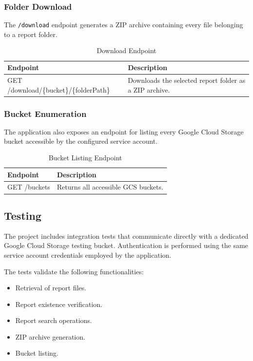 \subsubsection{Folder Download}

The \texttt{/download} endpoint generates a ZIP archive containing every file belonging to a report folder.

\begin{table}[H]
\centering
\caption{Download Endpoint}
\begin{tabular}{|p{6cm}|p{7cm}|}
\hline
\textbf{Endpoint} & \textbf{Description} \\
\hline
GET /download/\{bucket\}/\{folderPath\} & Downloads the selected report folder as a ZIP archive. \\
\hline
\end{tabular}
\end{table}

\subsubsection{Bucket Enumeration}

The application also exposes an endpoint for listing every Google Cloud Storage bucket accessible by the configured service account.

\begin{table}[H]
\centering
\caption{Bucket Listing Endpoint}
\begin{tabular}{|p{6cm}|p{7cm}|}
\hline
\textbf{Endpoint} & \textbf{Description} \\
\hline
GET /buckets & Returns all accessible GCS buckets. \\
\hline
\end{tabular}
\end{table}

\subsection{Testing}

The project includes integration tests that communicate directly with a dedicated Google Cloud Storage testing bucket. Authentication is performed using the same service account credentials employed by the application.

The tests validate the following functionalities:

\begin{itemize}
    \item Retrieval of report files.
    \item Report existence verification.
    \item Report search operations.
    \item ZIP archive generation.
    \item Bucket listing.
\end{itemize}

